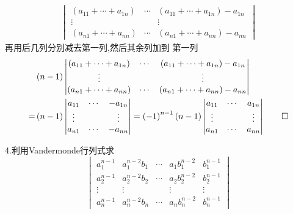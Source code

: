 \begin{Proof}
\begin{align*}
\begin{vmatrix}
			\left(a_{11}+\cdots
			+a_{1n}\right)
			&\cdots&\left(a_{11}+
			\cdots
			+a_{1n}\right)-a_{1n}\\
			\vdots&&\vdots\\
			\left(a_{n1}+\cdots
			+a_{nn}\right)
			&\cdots&\left(a_{n1}+
			\cdots
			+a_{nn}\right)-a_{nn}
		\end{vmatrix}
	\end{align*}
	再用后几列分别减去第一列,然后其余列加到
	第一列
	\begin{align*}
		&\left(n-1\right)
		\begin{vmatrix}
			\left(a_{11}+\cdots
			+a_{1n}\right)
			&\cdots&\left(a_{11}+
			\cdots
			+a_{1n}\right)-a_{1n}\\
			\vdots&&\vdots\\
			\left(a_{n1}+\cdots
			+a_{nn}\right)
			&\cdots&\left(a_{n1}+
			\cdots
			+a_{nn}\right)-a_{nn}
		\end{vmatrix}
		\\=&\left(n-1\right)
		\begin{vmatrix}
			a_{11} & \cdots & -a_{1n}\\
	\vdots &&\vdots\\
	a_{n1}&\cdots &-a_{nn}
		\end{vmatrix}=
		\left(-1\right)^{n-1}\left(n-1\right)
\begin{vmatrix}
	a_{11} & \cdots & a_{1n}\\
	\vdots &&\vdots\\
	a_{n1}&\cdots &a_{nn}
\end{vmatrix}
\qedhere
	\end{align*}
\end{Proof}
4.利用Vandermonde行列式求
\[
\begin{vmatrix}
	a_1^{n-1}&a_1^{n-2}b_1&\cdots&a_1b_1^{n-2}&b_1^{n-1}\\
	a_2^{n-1}&a_2^{n-2}b_2&\cdots&a_2b_2^{n-2}&b_2^{n-1}\\
	\vdots&\vdots&&\vdots&\vdots\\
	a_n^{n-1}&a_n^{n-2}b_n&\cdots&a_nb_n^{n-2}&b_n^{n-1}
\end{vmatrix}
\]
